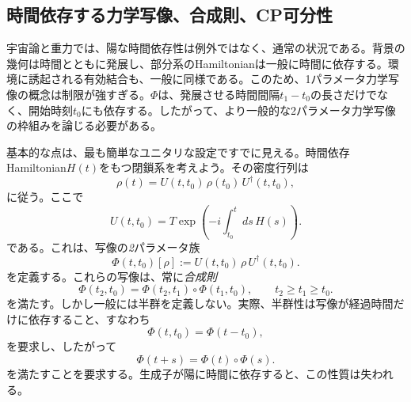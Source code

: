 \documentclass[a4paper,11pt,oneside]{article}
\theoremstyle{definition}
\numberwithin{equation}{section}
\begin{document}
\subsection{時間依存する力学写像、合成則、CP可分性}\label{sec:CPdiv}



宇宙論と重力では、陽な時間依存性は例外ではなく、通常の状況である。背景の幾何は時間とともに発展し、部分系のHamiltonianは一般に時間に依存する。環境に誘起される有効結合も、一般に同様である。このため、1パラメータ力学写像の概念は制限が強すぎる。$ \Phi$は、発展させる時間間隔$ t_{1}-t_{0}$の長さだけでなく、開始時刻$ t_{0}$にも依存する。したがって、より一般的な2パラメータ力学写像の枠組みを論じる必要がある。



基本的な点は、最も簡単なユニタリな設定ですでに見える。時間依存Hamiltonian\(H(t)\)をもつ閉鎖系を考えよう。その密度行列は
\begin{equation}
\rho(t)=U(t,t_0)\,\rho(t_0)\,U^\dagger(t,t_0) ,
\end{equation}
に従う。ここで
\begin{equation}
U(t,t_0)
=
T\exp\!\left(
-i\int_{t_0}^{t}ds\,H(s)
\right) .
\end{equation}
である。これは、写像の\textit{2}パラメータ族
\begin{equation}
\Phi(t,t_0)[\rho]
:=
U(t,t_0)\,\rho\,U^\dagger(t,t_0) .
\end{equation}
を定義する。これらの写像は、常に\textit{合成則}
\begin{equation}\label{compositionlaw}
\Phi(t_2,t_0)=\Phi(t_2,t_1)\circ \Phi(t_1,t_0) ,
\qquad
t_2\ge t_1\ge t_0 .
\end{equation}
を満たす。しかし一般には半群を定義しない。実際、半群性は写像が経過時間だけに依存すること、すなわち
\begin{equation}
\Phi(t,t_0)=\Phi(t-t_0) ,
\end{equation}
を要求し、したがって
\begin{equation}
\Phi(t+s)=\Phi(t)\circ \Phi(s) .
\end{equation}
を満たすことを要求する。生成子が陽に時間に依存すると、この性質は失われる。
\end{document}
